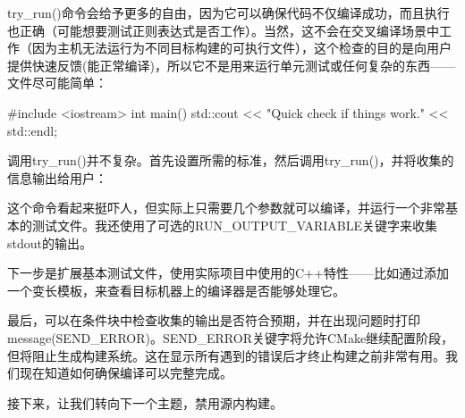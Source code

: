 try\_run()命令会给予更多的自由，因为它可以确保代码不仅编译成功，而且执行也正确（可能想要测试正则表达式是否工作）。当然，这不会在交叉编译场景中工作（因为主机无法运行为不同目标构建的可执行文件），这个检查的目的是向用户提供快速反馈(能正常编译)，所以它不是用来运行单元测试或任何复杂的东西——文件尽可能简单：


\begin{cpp}
#include <iostream>
int main()
{
    std::cout << "Quick check if things work." << std::endl;
}
\end{cpp}

调用try\_run()并不复杂。首先设置所需的标准，然后调用try\_run()，并将收集的信息输出给用户：



这个命令看起来挺吓人，但实际上只需要几个参数就可以编译，并运行一个非常基本的测试文件。我还使用了可选的RUN\_OUTPUT\_VARIABLE关键字来收集stdout的输出。

下一步是扩展基本测试文件，使用实际项目中使用的C++特性——比如通过添加一个变长模板，来查看目标机器上的编译器是否能够处理它。

最后，可以在条件块中检查收集的输出是否符合预期，并在出现问题时打印message(SEND\_ERROR)。SEND\_ERROR关键字将允许CMake继续配置阶段，但将阻止生成构建系统。这在显示所有遇到的错误后才终止构建之前非常有用。我们现在知道如何确保编译可以完整完成。

接下来，让我们转向下一个主题，禁用源内构建。
























